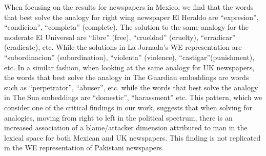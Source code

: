 \documentclass{article}
\begin{document}
{{When focusing on the results for newspapers in Mexico, we find that the words that best solve the analogy for right wing newspaper El Heraldo are “expresion”, “condicion”, “completa” (complete). The solution to the same analogy for the moderate El Universal are “libre” (free), “crueldad” (cruelty), “erradicar” (eradicate), etc. While the solutions in La Jornada’s WE representation are “subordinacion” (subordination), “violenta” (violence), “castigar”(punishment), etc. In a similar fashion, when looking at the same analogy for UK newspapers, the words that best solve the analogy in The Guardian embeddings are words such as “perpetrator”, “abuser”, etc. while the words that best solve the analogy in The Sun embeddings are “domestic”, “harassment” etc. This pattern, which we consider one of the critical findings in our work,  suggests that when solving for analogies,  moving from right to left in the political spectrum, there is an increased association of a blame/attacker dimension attributed to man in the lexical space for both Mexican and UK newspapers. This finding is not replicated in the WE representation of Pakistani newspapers. 


}}
\end{document}
